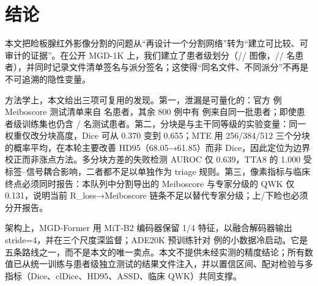 \section{结论}\label{sec:conclusion}

本文把睑板腺红外影像分割的问题从“再设计一个分割网络”转为“建立可比较、可审计的证据”。在公开 MGD-1K 上，我们建立了患者级划分（\nTrain/\nVal/\nTest{} 图像，\nTrainPatients/\nValPatients/\nTestPatients{} 名患者），并同时记录文件清单签名与派分签名；这使得“同名文件、不同派分”不再是不可追溯的隐性变量。

方法学上，本文给出三项可复用的发现。第一，泄漏是可量化的：官方 \officialTestImages{} 例 Meiboscore 测试清单来自 \officialTestPatients{} 名患者，其余 800 例中有 \officialLeakImages{} 例来自同一批患者；即使患者级训练集也仍含 \officialLeakPatients/\officialTestPatients{} 名测试患者。第二，分块是与主干同等级的实验变量：同一权重仅改分块高度，Dice 可从 0.370 变到 0.655；MTE 用 256/384/512 三个分块的概率平均，在本轮主要改善 HD95（68.05→61.85）而非 Dice，因此定位为边界校正而非涨点方法。多分块方差的失败检测 AUROC 仅 0.639，TTA8 的 1.000 受标签--信号耦合影响，二者都不足以单独作为 triage 规则。第三，像素指标与临床终点必须同时报告：本队列中分割导出的 Meiboscore 与专家分级的 QWK 仅 0.131，说明当前 R\_loss→Meiboscore 链条不足以替代专家分级；上/下睑也必须分开报告。

架构上，MGD-Former 用 MiT-B2 编码器保留 1/4 特征，以融合解码器输出 stride=4，并在三个尺度深监督；ADE20K 预训练针对 \nTotal{} 例的小数据冷启动。它是五条路线之一，而不是本文的唯一卖点。本文不提供未经实测的精度结论；所有数值已从统一训练与患者级独立测试的结果文件注入，并以置信区间、配对检验与多指标（Dice、clDice、HD95、ASSD、临床 QWK）共同支撑。
